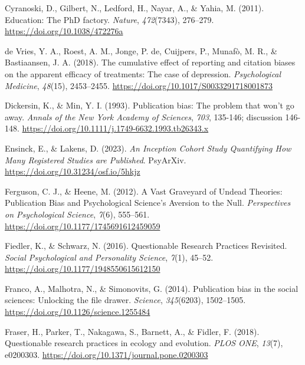 \documentclass[
  ,man,mask,floatsintext]{apa6}
\newlength{\cslhangindent}
\newlength{\cslentryspacingunit} %
\newenvironment{CSLReferences}[2] %
 {%
  \setlength{\parindent}{0pt}
  \ifodd #1
  \let\oldpar\par
  \def\par{\hangindent=\cslhangindent\oldpar}
  \fi
  \setlength{\parskip}{#2\cslentryspacingunit}
 }%
 {}
\begin{document}
\begin{CSLReferences}{1}{0}
\leavevmode{}%
Cyranoski, D., Gilbert, N., Ledford, H., Nayar, A., \& Yahia, M. (2011). Education: {The PhD} factory. \emph{Nature}, \emph{472}(7343), 276--279. \url{https://doi.org/10.1038/472276a}

\leavevmode{}%
de Vries, Y. A., Roest, A. M., Jonge, P. de, Cuijpers, P., Munafò, M. R., \& Bastiaansen, J. A. (2018). The cumulative effect of reporting and citation biases on the apparent efficacy of treatments: The case of depression. \emph{Psychological Medicine}, \emph{48}(15), 2453--2455. \url{https://doi.org/10.1017/S0033291718001873}

\leavevmode{}%
Dickersin, K., \& Min, Y. I. (1993). Publication bias: The problem that won't go away. \emph{Annals of the New York Academy of Sciences}, \emph{703}, 135-146; discussion 146-148. \url{https://doi.org/10.1111/j.1749-6632.1993.tb26343.x}

\leavevmode{}%
Ensinck, E., \& Lakens, D. (2023). \emph{An {Inception Cohort Study Quantifying How Many Registered Studies} are {Published}}. PsyArXiv. \url{https://doi.org/10.31234/osf.io/5hkjz}

\leavevmode{}%
Ferguson, C. J., \& Heene, M. (2012). A {Vast Graveyard} of {Undead Theories}: {Publication Bias} and {Psychological Science}'s {Aversion} to the {Null}. \emph{Perspectives on Psychological Science}, \emph{7}(6), 555--561. \url{https://doi.org/10.1177/1745691612459059}

\leavevmode{}%
Fiedler, K., \& Schwarz, N. (2016). Questionable {Research Practices Revisited}. \emph{Social Psychological and Personality Science}, \emph{7}(1), 45--52. \url{https://doi.org/10.1177/1948550615612150}

\leavevmode{}%
Franco, A., Malhotra, N., \& Simonovits, G. (2014). Publication bias in the social sciences: {Unlocking} the file drawer. \emph{Science}, \emph{345}(6203), 1502--1505. \url{https://doi.org/10.1126/science.1255484}

\leavevmode{}%
Fraser, H., Parker, T., Nakagawa, S., Barnett, A., \& Fidler, F. (2018). Questionable research practices in ecology and evolution. \emph{PLOS ONE}, \emph{13}(7), e0200303. \url{https://doi.org/10.1371/journal.pone.0200303}


\end{CSLReferences}
\end{document}
